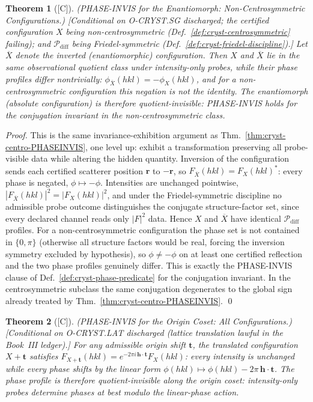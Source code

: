 \documentclass[12pt,oneside]{amsbook}
\theoremstyle{plain}
\newtheorem{theorem}{Theorem}[section]
\theoremstyle{definition}
\theoremstyle{remark}
\newcommand{\status}[1]{\textup{[#1]}}
\begin{document}
\begin{theorem}[\status{C}]\label{thm:cryst-enantiomorph-PHASEINVIS}
\textup{(PHASE-INVIS for the Enantiomorph: Non-Centrosymmetric
Configurations.)}
\textup{[Conditional on O-CRYST.SG discharged; the certified
configuration $X$ being non-centrosymmetric
(Def.~\ref{def:cryst-centrosymmetric} failing); and
$\mathcal{P}_{\mathrm{diff}}$ being Friedel-symmetric
(Def.~\ref{def:cryst-friedel-discipline}).]}
Let $\overline{X}$ denote the inverted (enantiomorphic)
configuration.  Then $X$ and $\overline{X}$ lie in the same
observational quotient class under intensity-only probes, while
their phase profiles differ nontrivially:
$\phi_{\overline{X}}(hkl) = -\phi_X(hkl)$, and for a
non-centrosymmetric configuration this negation is not the
identity.  The enantiomorph (absolute configuration) is therefore
quotient-invisible: PHASE-INVIS holds for the conjugation
invariant in the non-centrosymmetric class.
\end{theorem}

\begin{proof}
This is the same invariance-exhibition argument as
Thm.~\ref{thm:cryst-centro-PHASEINVIS}, one level up: exhibit a
transformation preserving all probe-visible data while altering
the hidden quantity.  Inversion of the configuration sends each
certified scatterer position $\mathbf{r}$ to $-\mathbf{r}$, so
$F_{\overline{X}}(hkl) = F_X(hkl)^*$: every phase is negated,
$\phi \mapsto -\phi$.  Intensities are unchanged pointwise,
$|F_{\overline{X}}(hkl)|^2 = |F_X(hkl)|^2$, and under the
Friedel-symmetric discipline no admissible probe outcome
distinguishes the conjugate structure-factor set, since every
declared channel reads only $|F|^2$ data.  Hence $X$ and
$\overline{X}$ have identical $\mathcal{P}_{\mathrm{diff}}$
profiles.  For a non-centrosymmetric configuration the phase set
is not contained in $\{0, \pi\}$ (otherwise all structure factors
would be real, forcing the inversion symmetry excluded by
hypothesis), so $\phi \neq -\phi$ on at least one certified
reflection and the two phase profiles genuinely differ.  This is
exactly the PHASE-INVIS clause of
Def.~\ref{def:cryst-phase-predicate} for the conjugation
invariant.  In the centrosymmetric subclass the same conjugation
degenerates to the global sign already treated by
Thm.~\ref{thm:cryst-centro-PHASEINVIS}. \qed
\end{proof}

\begin{theorem}[\status{C}]\label{thm:cryst-origin-PHASEINVIS}
\textup{(PHASE-INVIS for the Origin Coset: All Configurations.)}
\textup{[Conditional on O-CRYST.LAT discharged (lattice
translation lawful in the Book~III ledger).]}
For any admissible origin shift $\mathbf{t}$, the translated
configuration $X + \mathbf{t}$ satisfies
$F_{X+\mathbf{t}}(hkl) = e^{-2\pi i\,\mathbf{h}\cdot\mathbf{t}}
F_X(hkl)$: every intensity is unchanged while every phase shifts
by the linear form $\phi(hkl) \mapsto \phi(hkl) - 2\pi\,
\mathbf{h}\cdot\mathbf{t}$.  The phase profile is therefore
quotient-invisible along the origin coset: intensity-only probes
determine phases at best modulo the linear-phase action.
\end{theorem}
\end{document}
